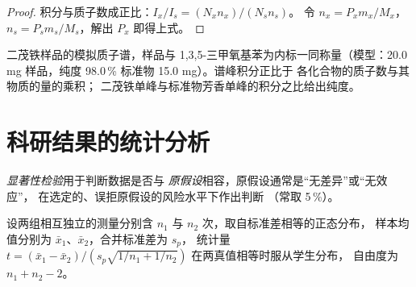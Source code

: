 \begin{proof}
积分与质子数成正比：$I_x/I_s = (N_xn_x)/(N_sn_s)$。
令 $n_x = P_xm_x/M_x$，$n_s = P_sm_s/M_s$，解出 $P_x$ 即得上式。
\end{proof}

\begin{omfigure}

{\small 二茂铁样品的模拟质子谱，样品与
1,3,5-三甲氧基苯为内标一同称量（模型：20.0 mg 样品，纯度 98.0\,\%
标准物 15.0 mg）。谱峰积分正比于
各化合物的质子数与其物质的量的乘积；
二茂铁单峰与标准物芳香单峰的积分之比给出纯度。}
\end{omfigure}

\section{科研结果的统计分析}

\begin{definition}[显著性检验]\label{def:b3:lab-techniques-3:tests}
\emph{显著性检验}用于判断数据是否与
\emph{原假设}相容，原假设通常是“无差异”或“无效应”，
在选定的、误拒原假设的风险水平下作出判断
（常取 5\,\%）。
\end{definition}

\begin{theorem}[双样本 $t$ 检验]\label{thm:b3:lab-techniques-3:t-test}
设两组相互独立的测量分别含 $n_1$ 与 $n_2$ 次，取自标准差相等的正态分布，
样本均值分别为 $\bar x_1$、$\bar x_2$，合并标准差为 $s_p$，
统计量 $t = (\bar x_1 - \bar x_2)/(s_p\sqrt{1/n_1 + 1/n_2})$ 在两真值相等时服从学生分布，
自由度为 $n_1 + n_2 - 2$。\admitted
\end{theorem}

